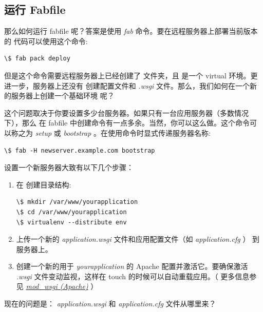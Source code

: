 \documentclass[a4paper,12pt]{sphinxmanual}
\begin{document}
\subsection{运行 Fabfile}
\label{patterns/fabric:id1}
那么如何运行 fabfile 呢？答案是使用 \emph{fab} 命令。要在远程服务器上部署当前版本的
代码可以使用这个命令:

\begin{Verbatim}[commandchars=\\\{\}]
\$ fab pack deploy
\end{Verbatim}

但是这个命令需要远程服务器上已经创建了  文件夹，且
 是一个 virtual 环境。更进一步，服务器上还没有
创建配置文件和 \emph{.wsgi} 文件。那么，我们如何在一个新的服务器上创建一个基础环境
呢？

这个问题取决于你要设置多少台服务器。如果只有一台应用服务器（多数情况下），那么
在 fabfile 中创建命令有一点多余。当然，你可以这么做。这个命令可以称之为
\emph{setup} 或 \emph{bootstrap} 。在使用命令时显式传递服务器名称:

\begin{Verbatim}[commandchars=\\\{\}]
\$ fab -H newserver.example.com bootstrap
\end{Verbatim}

设置一个新服务器大致有以下几个步骤：
\begin{enumerate}
\item {} 
在  创建目录结构:

\begin{Verbatim}[commandchars=\\\{\}]
\$ mkdir /var/www/yourapplication
\$ cd /var/www/yourapplication
\$ virtualenv --distribute env
\end{Verbatim}

\item {} 
上传一个新的 \emph{application.wsgi} 文件和应用配置文件（如 \emph{application.cfg} ）
到服务器上。

\item {} 
创建一个新的用于 \emph{yourapplication} 的 Apache 配置并激活它。要确保激活
\emph{.wsgi} 文件变动监视，这样在 touch 的时候可以自动重载应用。（ 更多信息参见
{\hyperref[deploying/mod_wsgi:mod-wsgi-deployment]{\emph{mod\_wsgi (Apache)}}} ）

\end{enumerate}

现在的问题是： \emph{application.wsgi} 和 \emph{application.cfg} 文件从哪里来？
\end{document}
